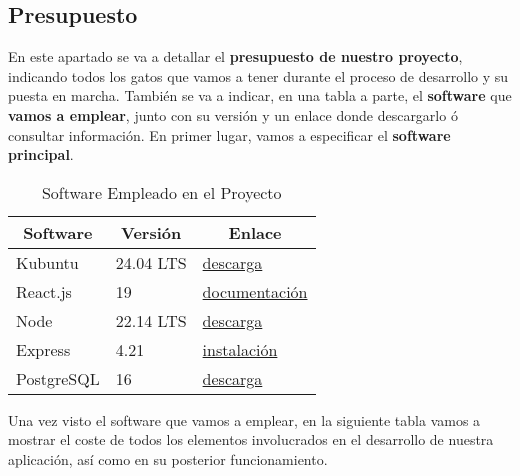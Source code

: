 \subsection{Presupuesto}
En este apartado se va a detallar el \textbf{presupuesto de nuestro proyecto}, indicando todos los gatos que vamos a tener durante el proceso de desarrollo y su puesta en marcha. También se va a indicar, en una tabla a parte, el \textbf{software} que \textbf{vamos a emplear}, junto con su versión y un enlace donde descargarlo ó consultar información. En primer lugar, vamos a especificar el \textbf{software principal}.

\begin{table}[H]
	\begin{center}
		\bgroup
		\def\arraystretch{1.5}
		\begin{tabular}{| p{4cm} | p{4cm} | p{4cm} |}
			\hline
			\multicolumn{1}{|c|}{\textbf{Software}} & \multicolumn{1}{|c|}{\textbf{Versión}} &  \multicolumn{1}{|c|}{\textbf{Enlace}} \\ \hline
			Kubuntu & 24.04 LTS & \href{https://kubuntu.org/getkubuntu/}{descarga} \\ \hline
			React.js & 19 & \href{https://react.dev/}{documentación} \\ \hline
			Node & 22.14 LTS & \href{https://nodejs.org/es/download}{descarga} \\ \hline
			Express & 4.21 & \href{https://expressjs.com/es/starter/installing.html}{instalación} \\ \hline
			PostgreSQL & 16 & \href{https://www.postgresql.org/download/}{descarga} \\ \hline
		\end{tabular}	
		\egroup
		\caption{Software Empleado en el Proyecto}
	\end{center}
\end{table}

Una vez visto el software que vamos a emplear, en la siguiente tabla vamos a mostrar el coste de todos los elementos involucrados en el desarrollo de nuestra aplicación, así como en su posterior funcionamiento.

